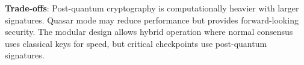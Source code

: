 \textbf{Trade-offs}: Post-quantum cryptography is computationally heavier with larger signatures. Quasar mode may reduce performance but provides forward-looking security. The modular design allows hybrid operation where normal consensus uses classical keys for speed, but critical checkpoints use post-quantum signatures.